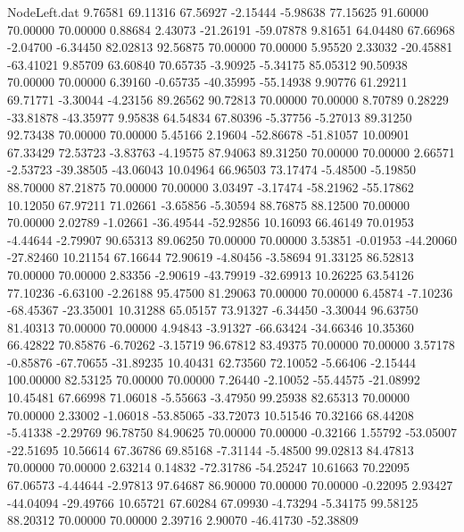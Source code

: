 \begin{filecontents}{NodeLeft.dat}
   9.76581   69.11316   67.56927    -2.15444   -5.98638   77.15625   91.60000   70.00000   70.00000    0.88684    2.43073  -21.26191  -59.07878
   9.81651   64.04480   67.66968    -2.04700   -6.34450   82.02813   92.56875   70.00000   70.00000    5.95520    2.33032  -20.45881  -63.41021
   9.85709   63.60840   70.65735    -3.90925   -5.34175   85.05312   90.50938   70.00000   70.00000    6.39160   -0.65735  -40.35995  -55.14938
   9.90776   61.29211   69.71771    -3.30044   -4.23156   89.26562   90.72813   70.00000   70.00000    8.70789    0.28229  -33.81878  -43.35977
   9.95838   64.54834   67.80396    -5.37756   -5.27013   89.31250   92.73438   70.00000   70.00000    5.45166    2.19604  -52.86678  -51.81057
  10.00901   67.33429   72.53723    -3.83763   -4.19575   87.94063   89.31250   70.00000   70.00000    2.66571   -2.53723  -39.38505  -43.06043
  10.04964   66.96503   73.17474    -5.48500   -5.19850   88.70000   87.21875   70.00000   70.00000    3.03497   -3.17474  -58.21962  -55.17862
  10.12050   67.97211   71.02661    -3.65856   -5.30594   88.76875   88.12500   70.00000   70.00000    2.02789   -1.02661  -36.49544  -52.92856
  10.16093   66.46149   70.01953    -4.44644   -2.79907   90.65313   89.06250   70.00000   70.00000    3.53851   -0.01953  -44.20060  -27.82460
  10.21154   67.16644   72.90619    -4.80456   -3.58694   91.33125   86.52813   70.00000   70.00000    2.83356   -2.90619  -43.79919  -32.69913
  10.26225   63.54126   77.10236    -6.63100   -2.26188   95.47500   81.29063   70.00000   70.00000    6.45874   -7.10236  -68.45367  -23.35001
  10.31288   65.05157   73.91327    -6.34450   -3.30044   96.63750   81.40313   70.00000   70.00000    4.94843   -3.91327  -66.63424  -34.66346
  10.35360   66.42822   70.85876    -6.70262   -3.15719   96.67812   83.49375   70.00000   70.00000    3.57178   -0.85876  -67.70655  -31.89235
  10.40431   62.73560   72.10052    -5.66406   -2.15444  100.00000   82.53125   70.00000   70.00000    7.26440   -2.10052  -55.44575  -21.08992
  10.45481   67.66998   71.06018    -5.55663   -3.47950   99.25938   82.65313   70.00000   70.00000    2.33002   -1.06018  -53.85065  -33.72073
  10.51546   70.32166   68.44208    -5.41338   -2.29769   96.78750   84.90625   70.00000   70.00000   -0.32166    1.55792  -53.05007  -22.51695
  10.56614   67.36786   69.85168    -7.31144   -5.48500   99.02813   84.47813   70.00000   70.00000    2.63214    0.14832  -72.31786  -54.25247
  10.61663   70.22095   67.06573    -4.44644   -2.97813   97.64687   86.90000   70.00000   70.00000   -0.22095    2.93427  -44.04094  -29.49766
  10.65721   67.60284   67.09930    -4.73294   -5.34175   99.58125   88.20312   70.00000   70.00000    2.39716    2.90070  -46.41730  -52.38809

\end{filecontents}
